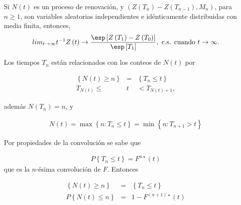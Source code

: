\begin{Coro}
Si $N\left(t\right)$ es un proceso de renovaci\'on, y $\left(Z\left(T_{n}\right)-Z\left(T_{n-1}\right),M_{n}\right)$, para $n\geq1$, son variables aleatorias independientes e id\'enticamente distribuidas con media finita, entonces,
\begin{eqnarray}
lim_{t\rightarrow\infty}t^{-1}Z\left(t\right)\rightarrow\frac{\esp\left[Z\left(T_{1}\right)-Z\left(T_{0}\right)\right]}{\esp\left[T_{1}\right]},\textrm{ c.s. cuando  }t\rightarrow\infty.
\end{eqnarray}
\end{Coro}



%
%

Los tiempos $T_{n}$ est\'an relacionados con los conteos de $N\left(t\right)$ por

\begin{eqnarray*}
\left\{N\left(t\right)\geq n\right\}&=&\left\{T_{n}\leq t\right\}\\
T_{N\left(t\right)}\leq &t&<T_{N\left(t\right)+1},
\end{eqnarray*}

adem\'as $N\left(T_{n}\right)=n$, y 

\begin{eqnarray*}
N\left(t\right)=\max\left\{n:T_{n}\leq t\right\}=\min\left\{n:T_{n+1}>t\right\}
\end{eqnarray*}

Por propiedades de la convoluci\'on se sabe que

\begin{eqnarray*}
P\left\{T_{n}\leq t\right\}=F^{n\star}\left(t\right)
\end{eqnarray*}
que es la $n$-\'esima convoluci\'on de $F$. Entonces 

\begin{eqnarray*}
\left\{N\left(t\right)\geq n\right\}&=&\left\{T_{n}\leq t\right\}\\
P\left\{N\left(t\right)\leq n\right\}&=&1-F^{\left(n+1\right)\star}\left(t\right)
\end{eqnarray*}

